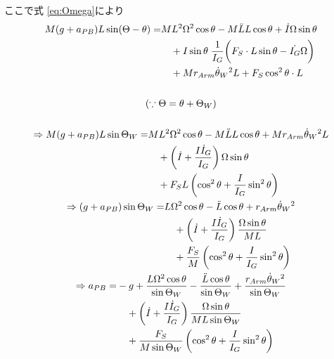 \documentclass[a4paper,11pt]{jsarticle}
\begin{document}
ここで式 \ref{eq:Omega}により
\begin{gather}
  \begin{aligned}
    M(g+a_{PB}) L\sin(\Theta - \theta)
    =&
    ML^2\Omega^2 \cos\theta - M\ddot{L}L \cos\theta
    + \dot{I}\Omega \sin\theta 
    \\
    &\quad + I\sin\theta
    \left.\frac{1}{I_G}\middle(
      F_S \cdot L\sin\theta
      -\dot{I_G}\Omega
    \right)
    \\
    &\quad + Mr_{Arm}\dot{\theta}_W{}^2L + F_S\cos^2\theta \cdot L
  \end{aligned}
  \\
  \notag
  \\
  \left(
    \because \Theta = \theta + \Theta_W
  \right)
  \notag
  \\
  \notag
  \\
  \begin{aligned}
    \Rightarrow
    M(g+a_{PB}) L\sin\Theta_W
    =&
    ML^2\Omega^2 \cos\theta - M\ddot{L}L \cos\theta
    + Mr_{Arm}\dot{\theta}_W{}^2L 
    \\
    &\quad
    + \left(
      \dot{I} + \frac{I\dot{I}_G}{I_G}
    \right)
    \Omega\sin\theta
    \\
    &\quad
    + F_S L\left(
      \cos^2\theta + \frac{I}{I_G}\sin^2\theta
    \right)
  \end{aligned}
  \\
  \begin{aligned}
    \Rightarrow
    (g+a_{PB})\sin\Theta_W
    =&
    L\Omega^2 \cos\theta - \ddot{L}\cos\theta
    + r_{Arm}\dot{\theta}_W{}^2
    \\
    &\quad
    + \left(
      \dot{I} + \frac{I\dot{I}_G}{I_G}
    \right)
    \frac{\Omega\sin\theta}{ML}
    \\
    &\quad
    + \frac{F_S}{M} \left(
      \cos^2\theta + \frac{I}{I_G}\sin^2\theta
    \right)
  \end{aligned}
  \\
  \begin{aligned}
    \Rightarrow
    a_{PB}
    =&
    -g +
    \frac{L\Omega^2 \cos\theta}{\sin\Theta_W}
    - \frac{\ddot{L}\cos\theta}{\sin\Theta_W}
    + \frac{r_{Arm}\dot{\theta}_W{}^2}{\sin\Theta_W}
    \\
    &\quad
    + \left(
      \dot{I} + \frac{I\dot{I}_G}{I_G}
    \right)
    \frac{\Omega\sin\theta}{ML\sin\Theta_W}
    \\
    &\quad
    + \frac{F_S}{M\sin\Theta_W} \left(
      \cos^2\theta + \frac{I}{I_G}\sin^2\theta
    \right)
  \end{aligned}
\end{gather}
\end{document}

